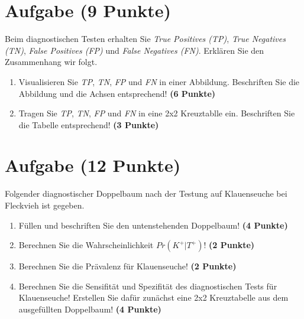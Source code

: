 \documentclass[a4paper, 10pt]{scrartcl}\usepackage[]{graphicx}\usepackage[]{xcolor}
\begin{document}
 
\clearpage

\section{Aufgabe \hfill (9 Punkte)}

Beim diagnostischen Testen erhalten Sie \textit{True Positives (TP)},
\textit{True Negatives (TN)}, \textit{False Positives (FP)} und
\textit{False Negatives (FN)}. Erkl{\"a}ren Sie den Zusammenhang wir folgt.

\begin{enumerate}
\item Visualisieren Sie \textit{TP}, \textit{TN}, \textit{FP} und
  \textit{FN} in einer Abbildung. Beschriften Sie die Abbildung und die
  Achsen entsprechend! \textbf{(6 Punkte)}
\item Tragen Sie \textit{TP}, \textit{TN}, \textit{FP} und \textit{FN} in
  eine 2x2 Kreuztablle ein. Beschriften Sie die Tabelle entsprechend!
  \textbf{(3 Punkte)}
\end{enumerate}





 
\clearpage

\section{Aufgabe \hfill (12 Punkte)}



Folgender diagnostischer Doppelbaum nach der Testung auf Klauenseuche bei
Fleckvieh ist gegeben.

\begin{enumerate}
\item F{\"u}llen und beschriften Sie den untenstehenden Doppelbaum! \textbf{(4
    Punkte)}
\item Berechnen Sie die Wahrscheinlichkeit $Pr(K^+|T^+)$! \textbf{(2 Punkte)}
\item Berechnen Sie die Pr{\"a}valenz f{\"u}r Klauenseuche! \textbf{(2 Punkte)}
\item Berechnen Sie die Sensifit{\"a}t und Spezifit{\"a}t des diagnostischen Tests
  f{\"u}r Klauenseuche! Erstellen Sie daf{\"u}r zun{\"a}chst eine 2x2 Kreuztabelle aus
  dem ausgef{\"u}llten Doppelbaum!
  \textbf{(4 Punkte)}
\end{enumerate}
\end{document}
